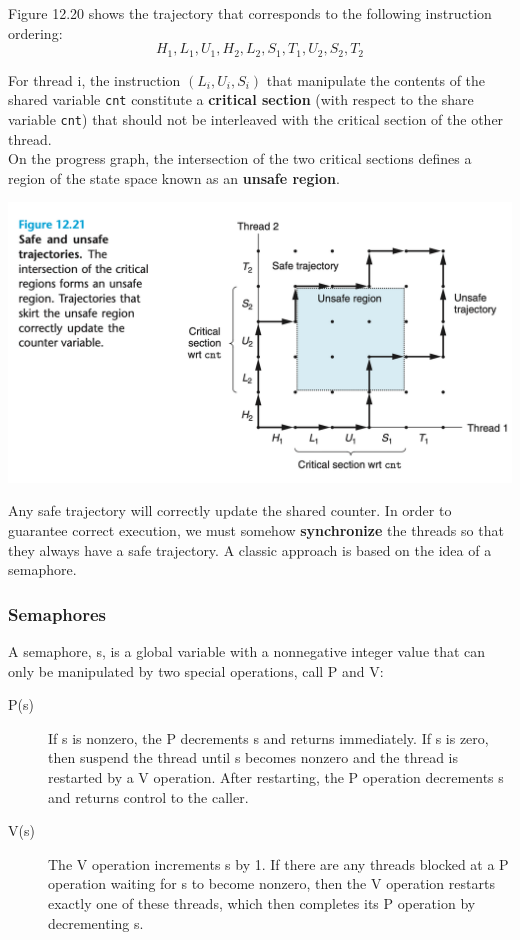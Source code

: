\documentclass[11pt]{article}
\begin{document}
Figure 12.20 shows the trajectory that corresponds to the following instruction ordering:\\
\begin{equation}
H_1, L_1, U_1, H_2, L_2, S_1, T_1, U_2, S_2, T_2
\end{equation}

For thread i, the instruction \((L_i, U_i, S_i)\) that manipulate the contents of the shared variable \texttt{cnt} constitute a \textbf{critical section} (with respect to the share variable \texttt{cnt}) that should not be interleaved with the critical section of the other thread.\\


On the progress graph, the intersection of the two critical sections defines a region of the state space known as an \textbf{unsafe region}.\\

\begin{center}
\includegraphics[width=.9\linewidth]{pics/figure12.21-safe-and-unsafe-trajetories.png}
\end{center}


Any safe trajectory will correctly update the shared counter. In order to guarantee correct execution, we must somehow \textbf{synchronize} the threads so that they always have a safe trajectory. A classic approach is based on the idea of a semaphore.\\


\subsubsection{Semaphores}
\label{sec:org75da5c3}
A semaphore, s, is a global variable with a nonnegative integer value that can only be manipulated by two special operations, call P and V:\\
\begin{description}
\item[{P(s)}] If s is nonzero, the P decrements s and returns immediately. If s is zero, then suspend the thread until s becomes nonzero and the thread is restarted by a V operation.  After restarting, the P operation decrements s and returns control to the caller.\\
\item[{V(s)}] The V operation increments s by 1. If there are any threads blocked at a P operation waiting for s to become nonzero, then the V operation restarts exactly one of these threads, which then completes its P operation by decrementing s.\\
\end{description}
\end{document}
